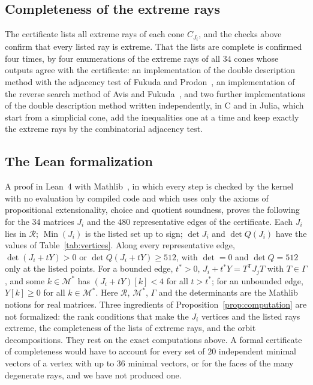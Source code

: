 \documentclass[11pt]{amsart}
\theoremstyle{definition}
\theoremstyle{remark}
\numberwithin{equation}{section}
\numberwithin{table}{section}
\numberwithin{figure}{section}
\newcommand{\M}{\mathcal{M}}
\newcommand{\Rk}{\mathcal{R}}
\newcommand{\Min}{\operatorname{Min}}
\newcommand{\T}{\mathsf{T}}
\begin{document}
\subsection*{Completeness of the extreme rays}
The certificate lists all extreme rays of each cone $C_{J_i}$, and the checks above confirm that every listed ray is extreme. That the lists are complete is confirmed four times, by four enumerations of the extreme rays of all $34$ cones whose outputs agree with the certificate: an implementation of the double description method with the adjacency test of Fukuda and Prodon~\cite{FukudaProdon1996}, an implementation of the reverse search method of Avis and Fukuda~\cite{AvisFukuda1992}, and two further implementations of the double description method written independently, in C and in Julia, which start from a simplicial cone, add the inequalities one at a time and keep exactly the extreme rays by the combinatorial adjacency test.

\subsection*{The Lean formalization}
A proof in Lean~4 with Mathlib~\cite{Lean4,mathlib}, in which every step is checked by the kernel with no evaluation by compiled code and which uses only the axioms of propositional extensionality, choice and quotient soundness, proves the following for the $34$ matrices $J_i$ and the $480$ representative edges of the certificate. Each $J_i$ lies in $\Rk$; $\Min(J_i)$ is the listed set up to sign; $\det J_i$ and $\det Q(J_i)$ have the values of Table~\ref{tab:vertices}. Along every representative edge, $\det(J_i+tY)>0$ or $\det Q(J_i+tY)\ge512$, with $\det=0$ and $\det Q=512$ only at the listed points. For a bounded edge, $t^*>0$, $J_i+t^*Y=T^\T J_jT$ with $T\in\Gamma$, and some $k\in\M^*$ has $(J_i+tY)[k]<4$ for all $t>t^*$; for an unbounded edge, $Y[k]\ge0$ for all $k\in\M^*$. Here $\Rk$, $\M^*$, $\Gamma$ and the determinants are the Mathlib notions for real matrices. Three ingredients of Proposition~\ref{prop:computation} are not formalized: the rank conditions that make the $J_i$ vertices and the listed rays extreme, the completeness of the lists of extreme rays, and the orbit decompositions. They rest on the exact computations above. A formal certificate of completeness would have to account for every set of $20$ independent minimal vectors of a vertex with up to $36$ minimal vectors, or for the faces of the many degenerate rays, and we have not produced one.
\end{document}
